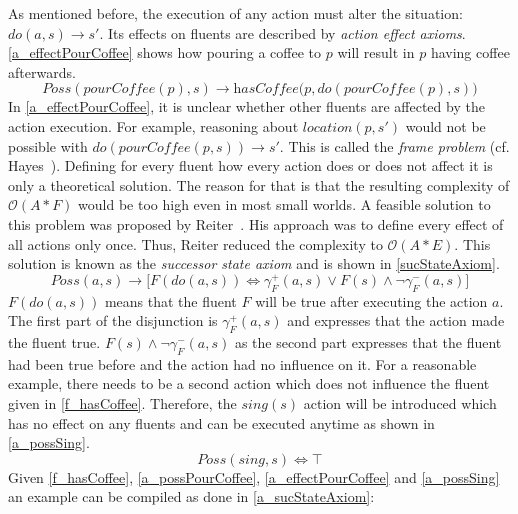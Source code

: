 As mentioned before, the execution of any action must alter the situation: $\textit{do}(a,s) \rightarrow s'$. Its effects on fluents are described by \emph{action effect axioms}. \autoref{a_effectPourCoffee} shows how pouring a coffee to $p$ will result in $p$ having coffee afterwards.
\begin{equation}\label{a_effectPourCoffee}
  \textit{Poss}(\textit{pourCoffee}(p),s) \rightarrow \textit{hasCoffee}\big(p,\textit{do}(\textit{pourCoffee}(p),s)\big)
\end{equation}
In \autoref{a_effectPourCoffee}, it is unclear whether other fluents are affected by the action execution. For example, reasoning about $location(p,s')$ would not be possible with $\textit{do}(\textit{pourCoffee}(p,s)) \rightarrow s'$. This is called the \emph{frame problem} (cf. Hayes~\cite{hayes_frame_1971}). %
Defining for every fluent how every action does or does not affect it is only a theoretical solution. The reason for that is that the resulting complexity of $\mathcal{O}(A*F)$ would be too high even in most small worlds. A feasible solution to this problem was proposed by Reiter~\cite{reiter_frame_1991}. His approach was to define every effect of all actions only once. Thus, Reiter reduced the complexity to $\mathcal{O}(A*E)$. This solution is known as the \emph{successor state axiom} and is shown in \autoref{sucStateAxiom}.
\begin{equation}\label{sucStateAxiom}
  \mathit{Poss}(a,s)\rightarrow \big[\mathit{F}(\mathit{do}(a,s)) \Leftrightarrow\gamma_\mathit{F}^+(a,s)\vee\mathit{F}(s)\wedge\neg\gamma_\mathit{F}^-(a,s)\big]
\end{equation}
$\mathit{F}(\mathit{do}(a,s))$ means that the fluent $F$ will be true after executing the action $a$. The first part of the disjunction is $\gamma_\mathit{F}^+(a,s)$ and expresses that the action made the fluent true. $\mathit{F}(s)\wedge\neg\gamma_\mathit{F}^-(a,s)$ as the second part expresses that the fluent had been true before and the action had no influence on it. For a reasonable example, there needs to be a second action which does not influence the fluent given in \autoref{f_hasCoffee}. Therefore, the $sing(s)$ action will be introduced which has no effect on any fluents and can be executed anytime as shown in \autoref{a_possSing}.
\begin{equation}\label{a_possSing}
  \mathit{Poss}(\mathit{sing}, s) \Leftrightarrow \top
\end{equation}
Given \autoref{f_hasCoffee}, \ref{a_possPourCoffee}, \ref{a_effectPourCoffee} and \ref{a_possSing} an example can be compiled as done in \autoref{a_sucStateAxiom}:
